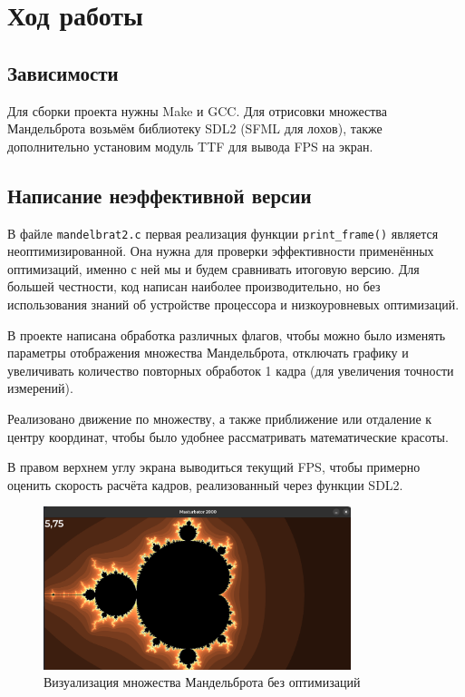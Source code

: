 \documentclass[12pt,a4paper]{article}
\begin{document}
\section{Ход работы}

\subsection{Зависимости}

Для сборки проекта нужны Make и GCC. Для отрисовки множества Мандельброта возьмём библиотеку SDL2 (SFML для лохов), также дополнительно установим модуль TTF для вывода FPS на экран.

\subsection{Написание неэффективной версии}

В файле \texttt{mandelbrat2.c} первая реализация функции \verb|print_frame()| является неоптимизированной. Она нужна для проверки эффективности применённых оптимизаций, именно с ней мы и будем сравнивать итоговую версию. Для большей честности, код написан наиболее производительно, но без использования знаний об устройстве процессора и низкоуровневых оптимизаций.

В проекте написана обработка различных флагов, чтобы можно было изменять параметры отображения множества Мандельброта, отключать графику и увеличивать количество повторных обработок 1 кадра (для увеличения точности измерений).

Реализовано движение по множеству, а также приближение или отдаление к центру координат, чтобы было удобнее рассматривать математические красоты.

В правом верхнем углу экрана выводиться текущий FPS, чтобы примерно оценить скорость расчёта кадров, реализованный через функции SDL2.

\begin{figure}[ht!]
    \centering
    \includegraphics[width=0.8\textwidth]{mandlebrat_navx.png}
    \caption{Визуализация множества Мандельброта без оптимизаций}
    \label{fig:mandlebrat_navx}
\end{figure}
\end{document}
